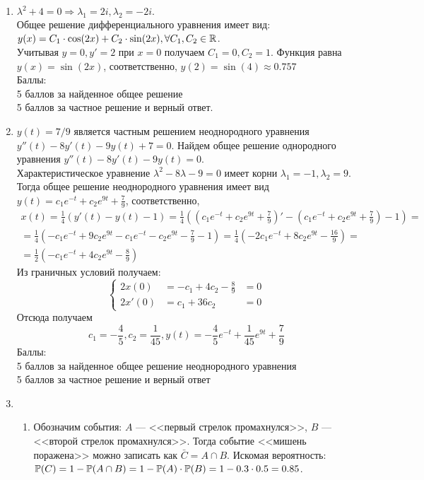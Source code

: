 \documentclass[pdftex,12pt,a4paper]{article}
\begin{document}
\begin{enumerate}
\begin{enumerate}
\end{enumerate}
\item $\lambda^2+4=0 \Rightarrow \lambda_1=2i, \lambda_2=-2i.$ \\
Общее решение дифференциального уравнения имеет вид: $y(x)=C_1\cdot \cos(2x)+C_2\cdot \sin(2x), \forall C_1,C_2 \in \R$.\\
Учитывая $y=0, y'=2$ при $x=0$ получаем $C_1=0, C_2=1$. Функция равна $y(x)=\sin(2x)$, соответственно, $y(2)=\sin(4)\approx 0.757$\\
Баллы:\\
5 баллов за найденное общее решение\\
5 баллов за частное решение и верный ответ.
\item $y(t)=7/9$ является частным решением неоднородного уравнения $y''(t)-8y'(t)-9y(t)+7=0$. Найдем общее решение однородного уравнения $y''(t)-8y'(t)-9y(t)=0$.\\
Характеристическое уравнение $\lambda^2-8\lambda-9=0$ имеет корни $\lambda_1=-1, \lambda_2=9$. Тогда общее решение неоднородного уравнения имеет вид $y(t)=c_1e^{-t}+c_2e^{9t}+\frac{7}{9}$, соответственно,
\begin{multline}
x(t)=\frac{1}{4}(y'(t)-y(t)-1)=\frac{1}{4}\left((c_1e^{-t}+c_2e^{9t}+\frac{7}{9})'-(c_1e^{-t}+c_2e^{9t}+\frac{7}{9})-1\right)= \\
= \frac{1}{4}\left(-c_1e^{-t}+9c_2e^{9t}-c_1e^{-t}-c_2e^{9t}-\frac{7}{9}-1\right)=\frac{1}{4}\left(-2c_1e^{-t}+8c_2e^{9t}-\frac{16}{9}\right)=\\
=\frac{1}{2}\left(-c_1e^{-t}+4c_2e^{9t}-\frac{8}{9}\right)
\end{multline}
Из граничных условий получаем: 
\[\left\{\begin{aligned}
2x(0) &=-c_1+4c_2-\frac{8}{9}&=0\\
2x'(0)&=c_1+36c_2 &=0
\end{aligned}\right.\]
Отсюда получаем 
\begin{equation}
c_1=-\frac{4}{5}, c_2=\frac{1}{45}, y(t)=-\frac{4}{5}e^{-t}+\frac{1}{45}e^{9t}+\frac{7}{9}
\end{equation}
Баллы:\\
5 баллов за найденное общее решение неоднородного уравнения\\
5 баллов за частное решение и верный ответ
\item \begin{enumerate}
\item Обозначим события: $A$ --- <<первый стрелок промахнулся>>, $B$ --- <<второй стрелок промахнулся>>. Тогда событие <<мишень поражена>> можно записать как $\bar{C}=A\cap B$. Искомая вероятность: $\P(C)=1-\P(A\cap B)=1-\P(A)\cdot \P(B)=1-0.3\cdot 0.5=0.85$.

\end{enumerate}
\end{enumerate}
\end{document}
